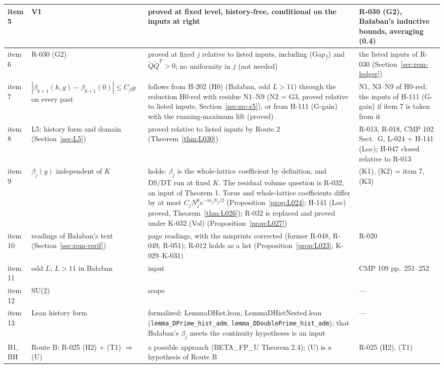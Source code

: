 \begin{longtable}{|p{1.3cm}|p{3.3cm}|p{6.2cm}|p{3.6cm}|}
item 5 & V1 & proved at fixed level, history-free, conditional on the inputs at right & R-030 (G2), Ba{\l}aban's inductive bounds, averaging (0.4) \\ \hline
item 6 & R-030 (G2) & proved at fixed $j$ relative to listed inputs, including (Gap$_f$) and $\tilde Q\tilde Q^T>0$; no uniformity in $j$ (not needed) & the listed inputs of R-030 (Section~\ref{sec:rem-ledger}) \\ \hline
item 7 & $|\beta_{k+1}(h,g)-\beta_{k+1}(0)|\le C_\beta g$ on every past & follows from H-202 (H0) (Ba{\l}aban, odd $L>11$) through the reduction H0-red with residue N1--N9 (N2 = G3, proved relative to listed inputs, Section~\ref{sec:src-r5}), or from H-111 (G-gain) with the running-maximum lift (proved) & N1, N3--N9 of H0-red; the inputs of H-111 (G-gain) if item 7 is taken from it \\ \hline
item 8 & L5: history form and domain (Section~\ref{sec:L5}) & proved relative to listed inputs by Route 2 (Theorem~\ref{thm:L030}) & R-013, R-018, CMP 102 Sect.~G, L-024 + H-141 (Loc); H-047 closed relative to R-013 \\ \hline
item 9 & $\beta_j(g)$ independent of $K$ & holds: $\beta_j$ is the whole-lattice coefficient by definition, and DS/DT run at fixed $K$. The residual volume question is R-032, an input of Theorem 1. Torus and whole-lattice coefficients differ by at most $C_jN_j^6e^{-m_jN_j/2}$ (Proposition~\ref{prop:L024}; H-141 (Loc) proved, Theorem~\ref{thm:L026}); R-032 is replaced and proved under K-032 (Vol) (Proposition~\ref{prop:L027}) & (K1), (K2) = item 7, (K3) \\ \hline
item 10 & readings of Ba{\l}aban's text (Section~\ref{sec:rem-verif}) & page readings, with the misprints corrected (former R-048, R-049, R-051); R-012 holds as a list (Proposition~\ref{prop:L023}; K-029--K-031) & R-020 \\ \hline
item 11 & odd $L$; $L>11$ in Ba{\l}aban & input & CMP 109 pp.\ 251--252 \\ \hline
item 12 & SU(2) & scope & --- \\ \hline
item 13 & Lean history form & formalized: LemmaDHist.lean, LemmaDHistNested.lean (\texttt{lemma\_DPrime\_hist\_adm}, \texttt{lemma\_DDoublePrime\_hist\_adm}); that Ba{\l}aban's $\beta_j$ meets the continuity hypotheses is an input & --- \\ \hline
B1, BH & Route B: R-025 (H2) + (T1) $\Rightarrow$ (U) & a possible approach (BETA\_\allowbreak{}FP\_\allowbreak{}U Theorem 2.4); (U) is a hypothesis of Route B & R-025 (H2), (T1) \\ \hline

\end{longtable}

